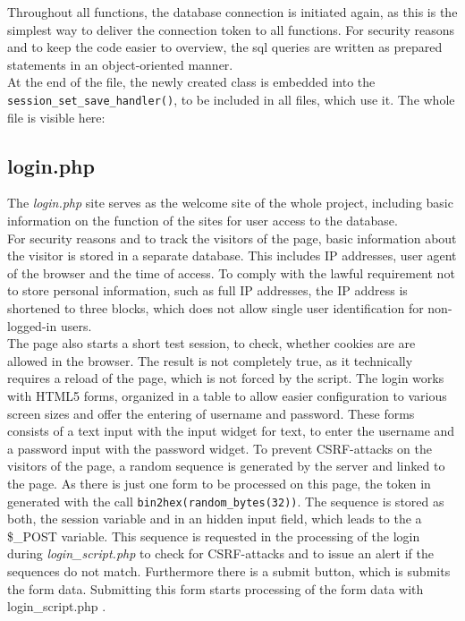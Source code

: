 Throughout all functions, the database connection is initiated again, as this is the simplest way to deliver the connection token to all functions. For security reasons and to keep the code easier to 
overview, the sql queries are written as prepared statements in an object-oriented manner.\\
At the end of the file, the newly created class is embedded into the \texttt{session\_set\_save\_handler()}, to be included in all files, which use it.
The whole file is visible here:


\subsection{login.php}
The \emph{login.php} site serves as the welcome site of the whole project, including basic information on the function of the sites for user access to the database.\\
For security reasons and to track the visitors of the page, basic information about the visitor is stored in a separate database. This includes IP addresses, user agent of 
the browser and the time of access. To comply with the lawful requirement not to store personal information, such as full IP addresses, the IP address is shortened to three blocks,
which does not allow single user identification for non-logged-in users.\\
The page also starts a short test session, to check, whether cookies are are allowed in the browser. The result is not completely true, as it technically requires a reload of the 
page, which is not forced by the script.
The login works with HTML5 forms, organized in a table to allow easier configuration to various screen sizes and offer the entering of username and password. 
These forms consists of a text input with the input widget for text, to enter the username and a password input with the 
password widget. To prevent CSRF-attacks on the visitors of the page, a random sequence is generated by the server and linked to the page. As there is just one form to be processed on this page, the 
token in generated with the call \texttt{bin2hex(random\_bytes(32))}. The sequence is stored as both, the session variable and in an hidden input field, which leads to the a \$\_POST variable. 
This sequence is requested in the processing of the login during \emph{login\_script.php} to check for CSRF-attacks and to issue an alert if the sequences do not match. 
Furthermore there is a submit button, which is submits the form data. Submitting this form starts processing of the form data with login\_script.php .

